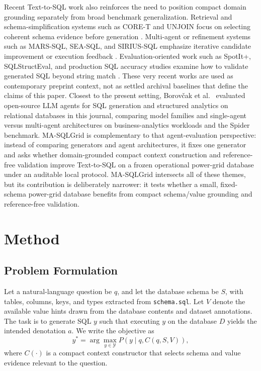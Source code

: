 \documentclass{article}
\begin{document}
Recent Text-to-SQL work also reinforces the need to position compact domain grounding separately from broad benchmark generalization. Retrieval and schema-simplification systems such as CORE-T and UNJOIN focus on selecting coherent schema evidence before generation \cite{soliman2026coret,ganesan2025unjoin}. Multi-agent or refinement systems such as MARS-SQL, SEA-SQL, and SIRIUS-SQL emphasize iterative candidate improvement or execution feedback \cite{yang2025marssql,li2024seasql,luo2026siriussql}. Evaluation-oriented work such as SpotIt+, SQLStructEval, and production SQL accuracy studies examine how to validate generated SQL beyond string match \cite{tremante2026spotit,zhou2026sqlstructeval,arif2026agentagnostic}. These very recent works are used as contemporary preprint context, not as settled archival baselines that define the claims of this paper. Closest to the present setting, Borov\v{c}ak et al.~\cite{borovcak2026evaluating} evaluated open-source LLM agents for SQL generation and structured analytics on relational databases in this journal, comparing model families and single-agent versus multi-agent architectures on business-analytics workloads and the Spider benchmark. MA-SQLGrid is complementary to that agent-evaluation perspective: instead of comparing generators and agent architectures, it fixes one generator and asks whether domain-grounded compact context construction and reference-free validation improve Text-to-SQL on a frozen operational power-grid database under an auditable local protocol. MA-SQLGrid intersects all of these themes, but its contribution is deliberately narrower: it tests whether a small, fixed-schema power-grid database benefits from compact schema/value grounding and reference-free validation.

\section{Method}\label{method}

\subsection{Problem Formulation}\label{sect:m1}

Let a natural-language question be $q$, and let the database schema be $S$, with tables, columns, keys, and types extracted from \texttt{schema.sql}. Let $V$ denote the available value hints drawn from the database contents and dataset annotations. The task is to generate SQL $y$ such that executing $y$ on the database $D$ yields the intended denotation $a$. We write the objective as
\begin{equation}
y^* = \arg\max_{y \in \mathcal{Y}} P(y \mid q, C(q,S,V)),
\end{equation}
where $C(\cdot)$ is a compact context constructor that selects schema and value evidence relevant to the question.
\end{document}
